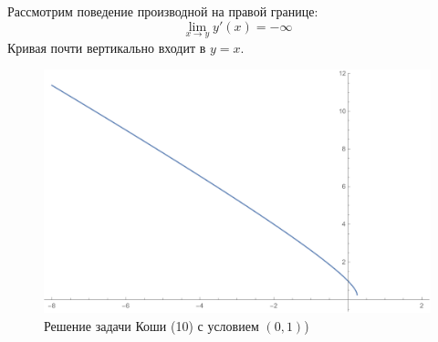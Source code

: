 \documentclass[a4paper, 12pt]{article}
\begin{document}
Рассмотрим поведение производной на правой границе:
\[\lim_{x\rightarrow y} y'(x) =-\infty\]
Кривая почти вертикально входит в $y=x.$

\begin{figure}[H]
	\centering
	\includegraphics[scale=0.7]{8}
\caption{Решение задачи Коши (10) с условием $(0, 1)$)}
\end{figure}
\end{document}
